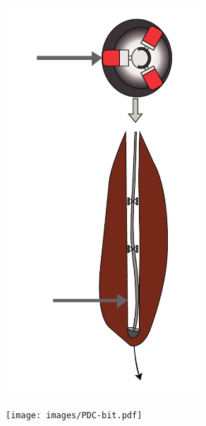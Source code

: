 \documentclass{beamer}
\begin{document}
\begin{frame}
\begin{columns}
\begin{column}{0.4\textwidth}
\begin{figure}[ht]
\begin{minipage}[t]{1\textwidth}
				\hspace{0cm}	\includegraphics[width=0.65\textwidth]{images/RSS.pdf}
				\end{minipage}
				\begin{minipage}[b]{1\textwidth}
			\hspace{1cm} \texttt{[image: images/PDC-bit.pdf]}
			\end{minipage}
			\end{figure}			
		\end{column}
	\end{columns}
\end{frame}
\end{document}
